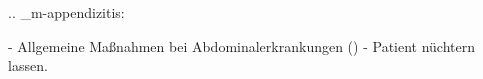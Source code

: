 

.. _m-appendizitis:

\begin{itemize}
  -   Allgemeine Maßnahmen bei Abdominalerkrankungen
  ()
  -   Patient nüchtern lassen.
\end{itemize}